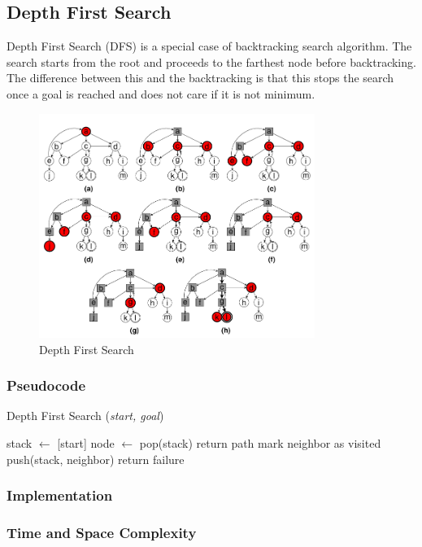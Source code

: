 \subsection{Depth First Search}
\noindent Depth First Search (DFS) is a special case of backtracking search algorithm. The search starts from the root and proceeds to the farthest node before backtracking. The difference between this and the backtracking is that this stops the search once a goal is reached and does not care if it is not minimum.

\begin{figure}[H]
	\centering
	\includegraphics[width=0.8\textwidth]{./imgs/dfs.png}
	\caption{Depth First Search}
\end{figure}

\subsubsection{Pseudocode}
\begin{algorithm}[H]
	\caption{Depth First Search (\textit{start, goal})}
	\label{alg:dfs}
	\begin{algorithmic}[1]
	\State stack $\gets$ [start]
		\State node $\gets$ pop(stack)
			\State return path
		\EndIf
				\State mark neighbor as visited
				\State push(stack, neighbor)
			\EndIf
		\EndFor
	\EndWhile
	\State return failure
	\end{algorithmic}
\end{algorithm}

\subsubsection{Implementation}

\subsubsection{Time and Space Complexity}